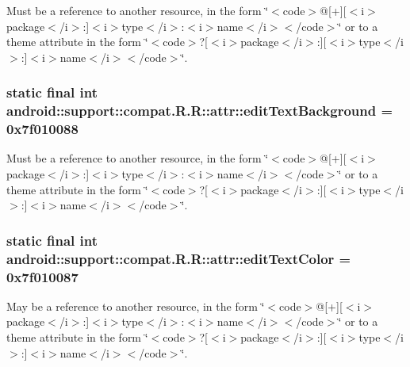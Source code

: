 Must be a reference to another resource, in the form \char`\"{}$<$code$>$@\mbox{[}+\mbox{]}\mbox{[}$<$i$>$package$<$/i$>$:\mbox{]}$<$i$>$type$<$/i$>$:$<$i$>$name$<$/i$>$$<$/code$>$\char`\"{} or to a theme attribute in the form \char`\"{}$<$code$>$?\mbox{[}$<$i$>$package$<$/i$>$:\mbox{]}\mbox{[}$<$i$>$type$<$/i$>$:\mbox{]}$<$i$>$name$<$/i$>$$<$/code$>$\char`\"{}. \hypertarget{classandroid_1_1support_1_1compat_1_1_r_1_1attr_088ed0a9069c0f4d068dc322bbd6c784}{
\subsubsection[{editTextBackground}]{\setlength{\rightskip}{0pt plus 5cm}static final int android::support::compat.R.R::attr::editTextBackground = 0x7f010088}}
\label{classandroid_1_1support_1_1compat_1_1_r_1_1attr_088ed0a9069c0f4d068dc322bbd6c784}


Must be a reference to another resource, in the form \char`\"{}$<$code$>$@\mbox{[}+\mbox{]}\mbox{[}$<$i$>$package$<$/i$>$:\mbox{]}$<$i$>$type$<$/i$>$:$<$i$>$name$<$/i$>$$<$/code$>$\char`\"{} or to a theme attribute in the form \char`\"{}$<$code$>$?\mbox{[}$<$i$>$package$<$/i$>$:\mbox{]}\mbox{[}$<$i$>$type$<$/i$>$:\mbox{]}$<$i$>$name$<$/i$>$$<$/code$>$\char`\"{}. \hypertarget{classandroid_1_1support_1_1compat_1_1_r_1_1attr_63d561e450a59379b342779c9d25224c}{
\subsubsection[{editTextColor}]{\setlength{\rightskip}{0pt plus 5cm}static final int android::support::compat.R.R::attr::editTextColor = 0x7f010087}}
\label{classandroid_1_1support_1_1compat_1_1_r_1_1attr_63d561e450a59379b342779c9d25224c}


May be a reference to another resource, in the form \char`\"{}$<$code$>$@\mbox{[}+\mbox{]}\mbox{[}$<$i$>$package$<$/i$>$:\mbox{]}$<$i$>$type$<$/i$>$:$<$i$>$name$<$/i$>$$<$/code$>$\char`\"{} or to a theme attribute in the form \char`\"{}$<$code$>$?\mbox{[}$<$i$>$package$<$/i$>$:\mbox{]}\mbox{[}$<$i$>$type$<$/i$>$:\mbox{]}$<$i$>$name$<$/i$>$$<$/code$>$\char`\"{}. 

